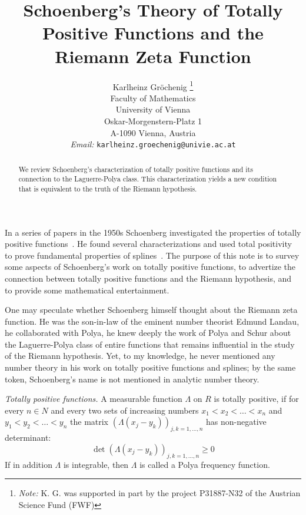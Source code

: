 \documentclass{article}
\newcommand{\tmaffiliation}[1]{\\ #1}
\newcommand{\tmem}[1]{{\em #1\/}}
\newcommand{\tmemail}[1]{\\ \textit{Email:} \texttt{#1}}
\newcommand{\tmnote}[1]{\thanks{\textit{Note:} #1}}
\providecommand{\*}{{\opl}}
\newcommand{\field}[1]{#1}
\newcommand{\bR}{\field{R}}
\newcommand{\bN}{\field{N}}
\newcommand{\<}{}
\newcommand{\>}{}
\newcommand{\tp}{totally positive}
\newcommand{\lpc}{Laguerre-Polya class}
\begin{document}
\title{Schoenberg's Theory of Totally Positive Functions and the Riemann Zeta
Function}

\author{
  Karlheinz Gr{\"o}chenig
  \tmnote{K. G. was supported in part by the project P31887-N32 of the
  Austrian Science Fund (FWF)}
  \tmaffiliation{Faculty of Mathematics\\
  University of Vienna\\
  Oskar-Morgenstern-Platz 1\\
  A-1090 Vienna, Austria}
  \tmemail{karlheinz.groechenig@univie.ac.at}
}

\date{}

\maketitle

\begin{abstract}
  We review Schoenberg's characterization of totally positive functions and
  its connection to the Laguerre-Polya class. This characterization yields a
  new condition that is equivalent to the truth of the Riemann hypothesis.
\end{abstract}

In a series of papers in the 1950s Schoenberg investigated the properties of
{\tp} functions~{\cite{CS66,sch47,Sch50,sch51,SW53}}. He found several
characterizations and used total positivity to prove fundamental properties of
splines~{\cite{SW53,Sch73}}. The purpose of this note is to survey some
aspects of Schoenberg's work on {\tp} functions, to advertize the connection
between {\tp} functions and the Riemann hypothesis, and to provide some
mathematical entertainment.

One may speculate whether Schoenberg himself thought about the Riemann zeta
function. He was the son-in-law of the eminent number theorist Edmund Landau,
he collaborated with Polya, he knew deeply the work of Polya and Schur about
the {\lpc} of entire functions that remains influential in the study of the
Riemann hypothesis. Yet, to my knowledge, he never mentioned any number theory
in his work on {\tp} functions and splines; by the same token, Schoenberg's
name is not mentioned in analytic number theory.

{\tmem{Totally positive functions.}} A measurable function $\Lambda$ on $\bR$
is {\tp}, if for every $n \in \bN$ and every two sets of increasing numbers
$x_1 < x_2 < \ldots < x_n$ and $y_1 < y_2 < \ldots < y_n$ the matrix $(\Lambda
(x_j - y_k))_{j, k = 1, \ldots, n}$ has non-negative determinant:
\begin{equation}
  \label{eq:1} \det (\Lambda (x_j - y_k))_{j, k = 1, \ldots, n} \geq 0
\end{equation}
If in addition $\Lambda$ is integrable, then $\Lambda$ is called a Polya
frequency function.
\end{document}
